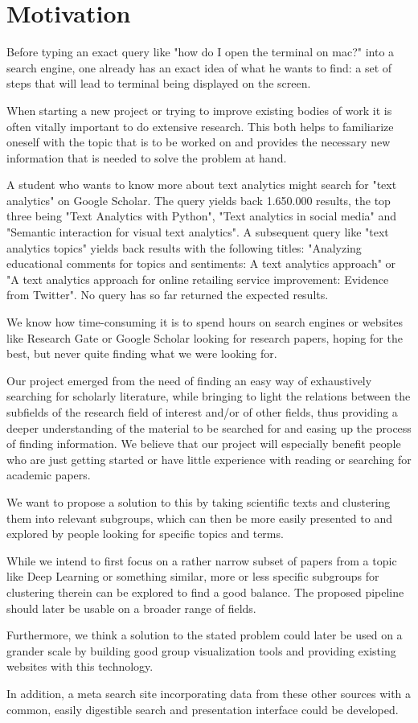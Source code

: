 \section{Motivation}

Before typing an exact query like "how do I open the terminal on mac?" into a search engine, one already has an exact idea of what he wants to find: a set of steps that will lead to terminal being displayed on the screen. 

When starting a new project or trying to improve existing bodies of work it is often vitally important to do extensive research. This both helps to familiarize oneself with the topic that is to be worked on and provides the necessary new information that is needed to solve the problem at hand.

A student who wants to know more about text analytics might search for "text analytics" on Google Scholar. The query yields back 1.650.000 results, the top three being "Text Analytics with Python", "Text analytics in social media" and "Semantic interaction for visual text analytics". A subsequent query like "text analytics topics" yields back results with the following titles: "Analyzing educational comments for topics and sentiments: A text analytics approach" or "A text analytics approach for online retailing service improvement: Evidence from Twitter". No query has so far returned the expected results.

We know how time-consuming it is to spend hours on search engines or websites like Research Gate or Google Scholar looking for research papers, hoping for the best, but never quite finding what we were looking for.

Our project emerged from the need of finding an easy way of exhaustively searching for scholarly literature, while bringing to light the relations between the subfields of the research field of interest and/or of other fields, thus providing a deeper understanding of the material to be searched for and easing up the process of finding information. We believe that our project will especially benefit people who are just getting started or have little experience with reading or searching for academic papers. 

We want to propose a solution to this by taking scientific texts and clustering them into relevant subgroups, which can then be more easily presented to and explored by people looking for specific topics and terms.

While we intend to first focus on a rather narrow subset of papers from a topic like Deep Learning or something similar, more or less specific subgroups for clustering therein can be explored to find a good balance. The proposed pipeline should later be usable on a broader range of fields.

Furthermore, we think a solution to the stated problem could later be used on a grander scale by building good group visualization tools and providing existing websites with this technology.

In addition, a meta search site incorporating data from these other sources with a common, easily digestible search and presentation interface could be developed.